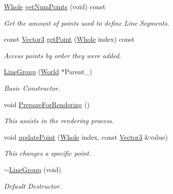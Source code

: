 \begin{DoxyCompactItemize}
\hyperlink{namespacephys_a460f6bc24c8dd347b05e0366ae34f34a}{Whole} \hyperlink{classphys_1_1LineGroup_a32e14111a18318fd17aa503b1d3cfe8c}{getNumPoints} (void) const 
\begin{DoxyCompactList}\small\item\em Get the amount of points used to define Line Segments. \item\end{DoxyCompactList}\item 
const \hyperlink{classphys_1_1Vector3}{Vector3} \hyperlink{classphys_1_1LineGroup_a960e1ceba7e9804b7906f8618f869202}{getPoint} (\hyperlink{namespacephys_a460f6bc24c8dd347b05e0366ae34f34a}{Whole} index) const 
\begin{DoxyCompactList}\small\item\em Access points by order they were added. \item\end{DoxyCompactList}\item 
\hyperlink{classphys_1_1LineGroup_a676039a6beec56d24c631e9da5fd7e76}{LineGroup} (\hyperlink{classphys_1_1World}{World} $\ast$Parent\_\-)
\begin{DoxyCompactList}\small\item\em Basic Constructor. \item\end{DoxyCompactList}\item 
void \hyperlink{classphys_1_1LineGroup_ab8d5c3c91dd16008429cc4cafed7f42f}{PrepareForRendering} ()
\begin{DoxyCompactList}\small\item\em This assists in the rendering process. \item\end{DoxyCompactList}\item 
void \hyperlink{classphys_1_1LineGroup_a3d98d0eb4fd15ac136d4649913dd80c8}{updatePoint} (\hyperlink{namespacephys_a460f6bc24c8dd347b05e0366ae34f34a}{Whole} index, const \hyperlink{classphys_1_1Vector3}{Vector3} \&value)
\begin{DoxyCompactList}\small\item\em This changes a specific point. \item\end{DoxyCompactList}\item 
\hyperlink{classphys_1_1LineGroup_a0ddd66bc946dd266e3b666c8101ea7f8}{$\sim$LineGroup} (void)
\begin{DoxyCompactList}\small\item\em Default Destructor. \item\end{DoxyCompactList}\end{DoxyCompactItemize}


